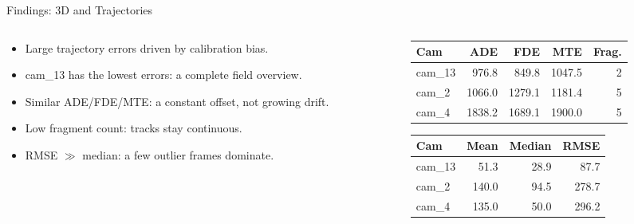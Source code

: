 \begin{frame}{Findings: 3D and Trajectories}
\begin{columns}[T]
  \begin{column}{0.52\textwidth}
    \begin{itemize}
      \item Large trajectory errors driven by calibration bias.
      \item cam\_13 has the lowest errors: a complete field overview.
      \item Similar ADE/FDE/MTE: a constant offset, not growing drift.
      \item Low fragment count: tracks stay continuous.
      \item RMSE $\gg$ median: a few outlier frames dominate.
    \end{itemize}
  \end{column}
  \begin{column}{0.46\textwidth}
    \centering
    \scriptsize
    \begin{tabular}{lrrrr}
      \toprule
      Cam & ADE & FDE & MTE & Frag. \\
      \midrule
      cam\_13 &  976.8 &  849.8 & 1047.5 & 2 \\
      cam\_2  & 1066.0 & 1279.1 & 1181.4 & 5 \\
      cam\_4  & 1838.2 & 1689.1 & 1900.0 & 5 \\
      \bottomrule
    \end{tabular}

    \vspace{2em}

    \begin{tabular}{lrrr}
      \toprule
      Cam & Mean & Median & RMSE \\
      \midrule
      cam\_13 &  51.3 & 28.9 &  87.7 \\
      cam\_2  & 140.0 & 94.5 & 278.7 \\
      cam\_4  & 135.0 & 50.0 & 296.2 \\
      \bottomrule
    \end{tabular}
  \end{column}
\end{columns}
\end{frame}
